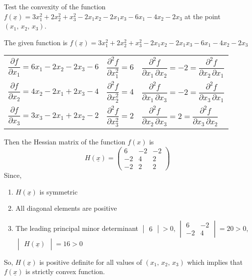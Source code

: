 \documentclass[../main-sheet.tex]{subfiles}
\begin{document}
\begin{prob}
    Test the convexity of the function \(f(\underline{x})=3x_1^2+2x_2^2+x_3^2-2x_1x_2-2x_1x_3-6x_1-4x_2-2x_3\) at the point \((x_1,\,x_2,\,x_3)\).
\end{prob}
\begin{soln}
    The given function is \(f(\underline{x})=3x_1^2+2x_2^2+x_3^2-2x_1x_2-2x_1x_3-6x_1-4x_2-2x_3\)
    \begin{table}[H]
        \centering
        \begin{tabular}{l@{\quad}|@{\quad}l@{\quad}|@{\quad}l}
            \(\dfrac{\partial f}{\partial x_1}=6x_1-2x_2-2x_3-6\)&\(\dfrac{\partial^2 f}{\partial x_1^2}=6\)&\(\dfrac{\partial^2 f}{\partial x_1\,\partial x_2}=-2=\dfrac{\partial^2 f}{\partial x_2\,\partial x_1}\)\\[2.5ex]
            \(\dfrac{\partial f}{\partial x_2}=4x_2-2x_1+2x_3-4\)&\(\dfrac{\partial^2 f}{\partial x_2^2}=4\)&\(\dfrac{\partial^2 f}{\partial x_1\,\partial x_3}=-2=\dfrac{\partial^2 f}{\partial x_3\,\partial x_1}\)\\[2.5ex]
            \(\dfrac{\partial f}{\partial x_3}=3x_3-2x_1+2x_2-2\)&\(\dfrac{\partial^2 f}{\partial x_3^2}=2\)&\(\dfrac{\partial^2 f}{\partial x_2\,\partial x_3}=2=\dfrac{\partial^2 f}{\partial x_3\,\partial x_2}\)\\
        \end{tabular}
    \end{table}
    Then the Hessian matrix of the function \(f(x)\) is
    \[H(\underline{x})=\begin{pmatrix}
        6&-2&-2\\
        -2&4&2\\
        -2&2&2
    \end{pmatrix}
    \]
    Since,
    \begin{enumerate}[label=(\roman*)]
        \item \(H(\underline{x})\) is symmetric
        \item All diagonal elements are positive
        \item The leading principal minor determinant \(\begin{vmatrix}
            6
        \end{vmatrix}>0\), \(\begin{vmatrix}
            6 &-2\\
            -2&4
        \end{vmatrix}=20>0\), \(\begin{vmatrix}
            H(\underline{x})
        \end{vmatrix}=16>0\)
    \end{enumerate}
    So, \(H(\underline{x})\) is positive definite for all values of \((x_1,\,x_2,\,x_3)\) which implies that \(f(\underline{x})\) is strictly convex function.
\end{soln}
\end{document}
